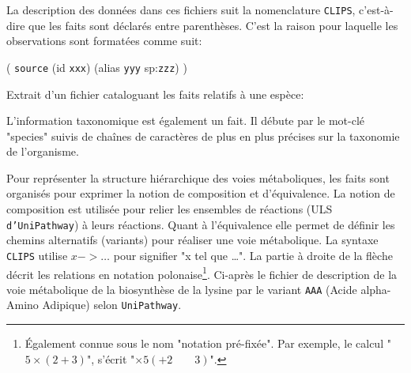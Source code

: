 \begin{refsegment}


La description des données dans ces fichiers suit la nomenclature \texttt{\gls{CLIPS}}, c'est-à-dire que les faits sont déclarés entre parenthèses. C'est la raison pour laquelle les observations sont formatées comme suit: 

( \texttt{source} (id \texttt{xxx}) (alias \texttt{yyy} sp:\texttt{zzz})  )

Extrait d'un fichier cataloguant les faits relatifs à une espèce:\nolisttopbreak



L'information taxonomique est également un fait. Il débute par le mot-clé "species" suivis de chaînes de caractères de plus en plus précises sur la taxonomie de l'organisme.


Pour représenter la structure hiérarchique des voies métaboliques, les faits sont organisés pour exprimer la notion de composition et d'équivalence. La notion de composition est utilisée pour relier les ensembles de réactions (\gls{ULS} \texttt{d’UniPathway}) à leurs réactions. Quant à l'équivalence elle permet de définir les chemins alternatifs (variants) pour réaliser une voie métabolique. La syntaxe \texttt{\gls{CLIPS}} utilise $x -> \ldots$ pour signifier "x tel que \ldots". La partie à droite de la flèche décrit les relations en notation polonaise\footnote{Également connue sous le nom "notation pré-fixée". Par exemple, le calcul "$5 \times (2 + 3)$", s'écrit "$\times 5 (+ 2 \qquad 3)$". }. Ci-après le fichier de description de la voie métabolique de la biosynthèse de la lysine par le variant \texttt{AAA} (Acide alpha-Amino Adipique) selon \texttt{UniPathway}.


\end{refsegment}
